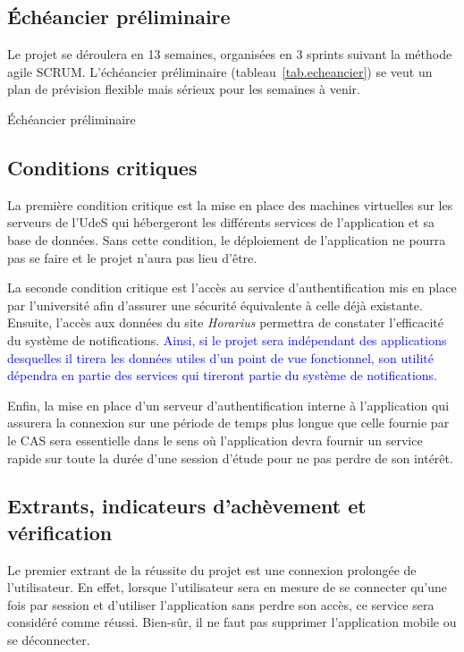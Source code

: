 	\subsection{Échéancier préliminaire}
	Le projet se déroulera en 13 semaines, organisées en 3 sprints suivant la méthode agile SCRUM. L'échéancier préliminaire (tableau~\ref{tab.echeancier}) se veut un plan de prévision flexible mais sérieux pour les semaines à venir.
	\begin{table}[hp]
		\centering
		\caption{Échéancier préliminaire}
		
		\label{tab.echeancier}
	\end{table}

	\subsection{Conditions critiques}
	La première condition critique est la mise en place des machines virtuelles sur les serveurs de l'UdeS qui hébergeront les différents services de l'application et sa base de données. Sans cette condition, le déploiement de l'application ne pourra pas se faire et le projet n'aura pas lieu d'être.

	La seconde condition critique est l'accès au service d'authentification mis en place par l'université afin d'assurer une sécurité équivalente à celle déjà existante. Ensuite, l'accès aux données du site \emph{Horarius} permettra de constater l'efficacité du système de notifications. \textcolor{blue}{Ainsi, si le projet sera indépendant des applications desquelles il tirera les données utiles d'un point de vue fonctionnel, son utilité dépendra en partie des services qui tireront partie du système de notifications}.

	Enfin, la mise en place d'un serveur d'authentification interne à l'application qui assurera la connexion sur une période de temps plus longue que celle fournie par le CAS sera essentielle dans le sens où l'application devra fournir un service rapide sur toute la durée d'une session d’étude pour ne pas perdre de son intérêt.

	\subsection{Extrants, indicateurs d'achèvement et vérification}
	Le premier extrant de la réussite du projet est une connexion prolongée de l’utilisateur. En effet, lorsque l’utilisateur sera en mesure de se connecter qu’une fois par session et d’utiliser l’application sans perdre son accès, ce service sera considéré comme réussi. Bien-sûr, il ne faut pas supprimer l’application mobile ou se déconnecter.

